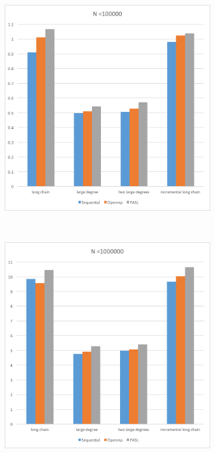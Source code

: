 \documentclass[specification,annotation,times]{itmo-student-thesis}
\begin{document}
\begin{figure}[!ht]
\begin{subfigure}[b]{0.45\textwidth}
    \includegraphics[width=\textwidth]{pic/results-1-b.png}
\end{subfigure}\\
\begin{subfigure}[b]{0.45\textwidth}
    \includegraphics[width=\textwidth]{pic/results-1-c.png}

\end{subfigure}
\end{figure}
\end{document}
